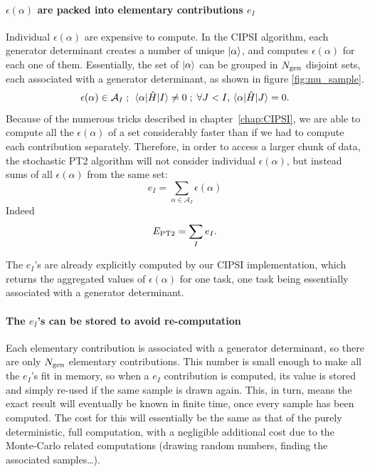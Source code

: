 \documentclass[./thesis.tex]{subfiles}
\begin{document}
\paragraph{$\epsilon(\alpha)$ are packed into elementary contributions $e_I$}
Individual $\epsilon(\alpha)$ are expensive to compute. In the CIPSI algorithm, each generator determinant creates a number of unique ${\ket{\alpha}}$, and computes $\epsilon(\alpha)$ for each one of them.
Essentially, the set of ${\ket{\alpha}}$ can be grouped in ${N_\text{gen}}$ disjoint sets, each associated with a generator determinant, as shown in figure \ref{fig:mu_sample}.
\begin{equation}
\epsilon(\alpha) \in \mathcal{A}_I \; ; \; \mel{\alpha}{\hat{H}}{I} \neq 0 \; ; \;   \forall J < I, \mel{\alpha}{\hat{H}}{J} = 0.
\end{equation}
Because of the numerous tricks described in chapter~\ref{chap:CIPSI}, we are able to compute all the $\epsilon(\alpha)$ of a set considerably faster than if we had to compute each contribution separately. Therefore, in order to access a larger chunk of data, the stochastic PT2 algorithm will not consider individual $\epsilon(\alpha)$, but instead sums of all $\epsilon(\alpha)$ from the same set:
\begin{equation}
e_I = \sum_{\alpha \in \mathcal{A}_I} \epsilon(\alpha)
\end{equation}
Indeed
\begin{equation}
E_\text{PT2} = \sum_{I} e_I.
\end{equation}

The $e_I$'s are already explicitly computed by our CIPSI implementation, which returns the aggregated values of $\epsilon(\alpha)$ for one task, one task being essentially associated with a generator determinant.

\paragraph{The $e_I$'s can be stored to avoid re-computation}
Each elementary contribution is associated with a generator determinant, so there are only ${N_\text{gen}}$ elementary contributions. This number is small enough to make all the $e_I$'s fit in memory, so when a $e_I$ contribution is computed, its value is stored and simply re-used if the same sample is drawn again. This, in turn, means the exact result will eventually be known in finite time, once every sample has been computed. The cost for this will essentially be the same as that of the purely deterministic, full computation, with a negligible additional cost due to the Monte-Carlo related computations (drawing random numbers, finding the associated samples\dots).
\end{document}
